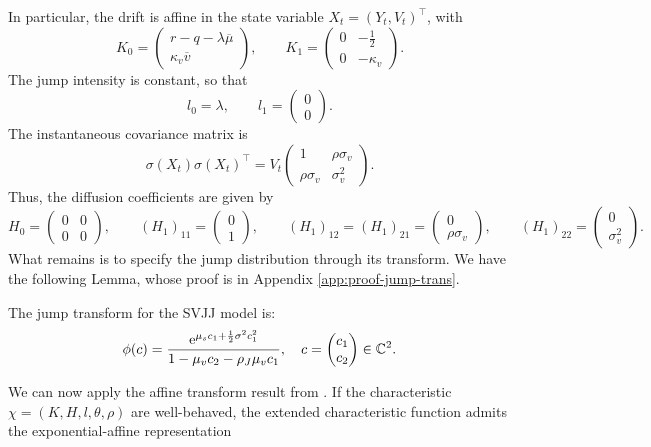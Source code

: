 In particular, the drift is affine in the state variable \(X_t=(Y_t,V_t)^\top\), with
\[
K_0 =
\begin{pmatrix}
r-q-\lambda\overline{\mu}\\
\kappa_v\overline{v}
\end{pmatrix},
\qquad
K_1 =
\begin{pmatrix}
0 & -\frac{1}{2}\\
0 & -\kappa_v
\end{pmatrix}.
\]
The jump intensity is constant, so that
\[
l_0=\lambda, \qquad l_1= \begin{pmatrix} 0\\ 0 \end{pmatrix}.
\]
The instantaneous covariance matrix is
\[
\sigma(X_t)\sigma(X_t)^\top = V_t 
\begin{pmatrix} 
  1 & \rho\sigma_v\\ 
\rho\sigma_v & \sigma_v^2 
\end{pmatrix}.
\]
Thus, the diffusion coefficients are given by
\[
H_0 =
\begin{pmatrix}
0&0\\
0&0
\end{pmatrix},
\qquad 
(H_1)_{11} =
\begin{pmatrix}0\\1\end{pmatrix},
\qquad
(H_1)_{12}=(H_1)_{21} =
\begin{pmatrix}0\\\rho\sigma_v\end{pmatrix},
\qquad
(H_1)_{22} =
\begin{pmatrix}0\\\sigma_v^2\end{pmatrix}.
\]
What remains is to specify the jump distribution through its transform. We have the following Lemma,
whose proof is in Appendix \ref{app:proof-jump-trans}.
\begin{lemma}
  \label{lem:svjj-jump-trans}
  The jump transform for the SVJJ model is:
  \begin{equation} 
  \phi(c)  = \frac{\text{e}^{\mu_s c_1 + \frac{1}{2} \sigma^2 c_1^2 }}{1-\mu_v c_2 -
  \rho_J\mu_v c_1}, \quad  c = \begin{pmatrix}
  c_1\\
  c_2
  \end{pmatrix}
  \in \mathbb{C}^2 
  \label{eq:svjj-jump-trans}
  .\end{equation}
\end{lemma}

We can now apply the affine transform result from . If the characteristic $\chi
= (K,H,l,\theta,\rho)$ are well-behaved, the extended characteristic function admits the
exponential-affine representation

